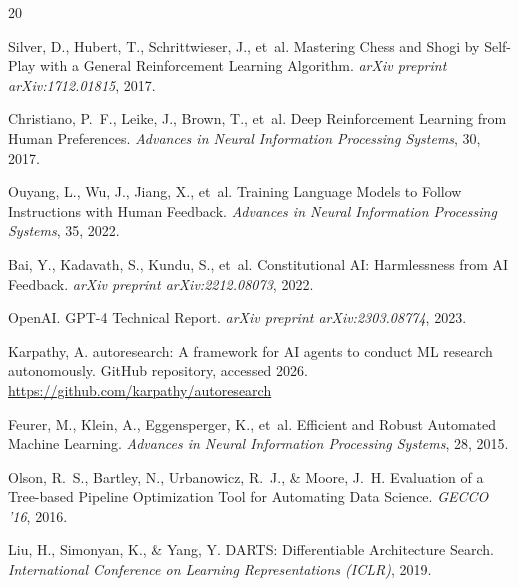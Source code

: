 \documentclass[11pt]{article}
\begin{document}

\begin{thebibliography}{20}

Silver, D., Hubert, T., Schrittwieser, J., et~al.
\newblock Mastering Chess and Shogi by Self-Play with a General Reinforcement Learning Algorithm.
\newblock \emph{arXiv preprint arXiv:1712.01815}, 2017.

Christiano, P.~F., Leike, J., Brown, T., et~al.
\newblock Deep Reinforcement Learning from Human Preferences.
\newblock \emph{Advances in Neural Information Processing Systems}, 30, 2017.

Ouyang, L., Wu, J., Jiang, X., et~al.
\newblock Training Language Models to Follow Instructions with Human Feedback.
\newblock \emph{Advances in Neural Information Processing Systems}, 35, 2022.

Bai, Y., Kadavath, S., Kundu, S., et~al.
\newblock Constitutional AI: Harmlessness from AI Feedback.
\newblock \emph{arXiv preprint arXiv:2212.08073}, 2022.

OpenAI.
\newblock GPT-4 Technical Report.
\newblock \emph{arXiv preprint arXiv:2303.08774}, 2023.

Karpathy, A.
\newblock autoresearch: A framework for AI agents to conduct ML research autonomously.
\newblock GitHub repository, accessed 2026.
\newblock \url{https://github.com/karpathy/autoresearch}

Feurer, M., Klein, A., Eggensperger, K., et~al.
\newblock Efficient and Robust Automated Machine Learning.
\newblock \emph{Advances in Neural Information Processing Systems}, 28, 2015.

Olson, R.~S., Bartley, N., Urbanowicz, R.~J., \& Moore, J.~H.
\newblock Evaluation of a Tree-based Pipeline Optimization Tool for Automating Data Science.
\newblock \emph{GECCO '16}, 2016.

Liu, H., Simonyan, K., \& Yang, Y.
\newblock DARTS: Differentiable Architecture Search.
\newblock \emph{International Conference on Learning Representations (ICLR)}, 2019.


\end{thebibliography}
\end{document}
